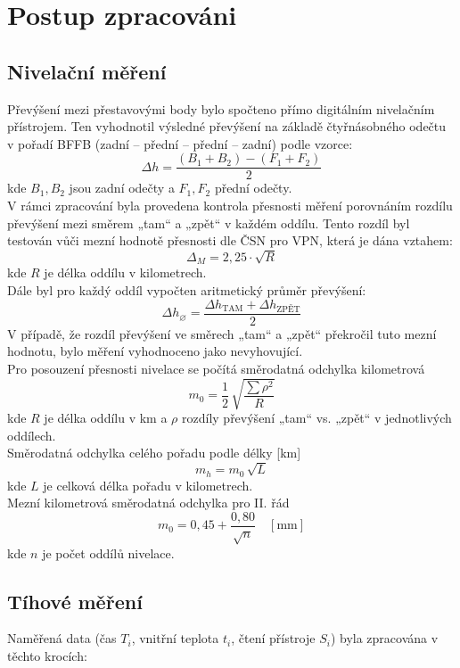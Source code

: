 \section{Postup zpracováni}

\subsection{Nivelační měření}

Převýšení mezi přestavovými body bylo spočteno přímo digitálním nivelačním přístrojem. Ten vyhodnotil výsledné převýšení na základě čtyřnásobného odečtu v pořadí BFFB (zadní – přední – přední – zadní) podle vzorce:
\[
\Delta h = \frac{(B_1 + B_2) - (F_1 + F_2)}{2}
\]
kde \( B_1, B_2 \) jsou zadní odečty a \( F_1, F_2 \) přední odečty.\\
V rámci zpracování byla provedena kontrola přesnosti měření porovnáním rozdílu převýšení mezi směrem „tam“ a „zpět“ v každém oddílu. Tento rozdíl byl testován vůči mezní hodnotě přesnosti dle ČSN pro VPN, která je dána vztahem:
\[
\Delta_M = 2,25 \cdot \sqrt{R}
\]
kde \( R \) je délka oddílu v kilometrech.\\
Dále byl pro každý oddíl vypočten aritmetický průměr převýšení:
\[
\Delta h_{\diameter} = \frac{\Delta h_{\text{TAM}} + \Delta h_{\text{ZPĚT}}}{2}
\]
V případě, že rozdíl převýšení ve směrech „tam“ a „zpět“ překročil tuto mezní hodnotu, bylo měření vyhodnoceno jako nevyhovující.\cite{zadani}\\
Pro posouzení přesnosti nivelace se počítá směrodatná odchylka kilometrová
\[
  m_0 = \frac{1}{2}\,\sqrt{\frac{\sum\rho^2}{R}}
\]
kde \( R \) je délka oddílu v km a \(\rho\) rozdíly převýšení „tam“ vs. „zpět“ v jednotlivých oddílech.\\
Směrodatná odchylka celého pořadu podle délky [km]
\[
  m_h = m_0 \,\sqrt{L}
\]
kde \(L\) je celková délka pořadu v kilometrech.\\
Mezní kilometrová směrodatná odchylka pro II. řád
\[
  m_0 = 0{,}45 + \frac{0{,}80}{\sqrt{n}}\quad [\mathrm{mm}]
\]
kde \(n\) je počet oddílů nivelace.

\subsection{Tíhové měření}

Naměřená data (čas \(T_i\), vnitřní teplota \(t_i\), čtení přístroje \(S_i\)) byla zpracována v těchto krocích:

